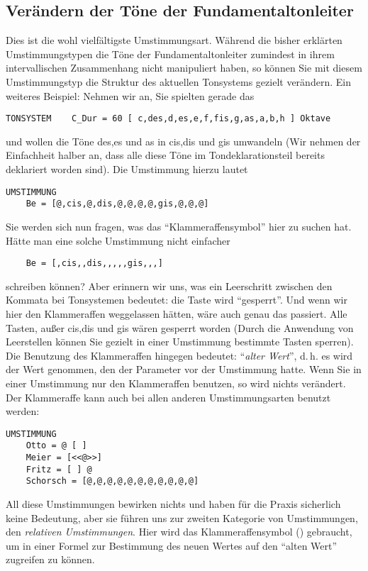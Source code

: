 \subsection{Verändern der Töne der Fundamentaltonleiter}\label{sec:verandern-der-tone}

Dies ist die wohl vielfältigste Umstimmungsart. Während die bisher
er\-klär\-ten Umstimmungstypen die Töne der Fundamentaltonleiter zumindest in ihrem
intervallischen Zusammenhang nicht manipuliert haben, so können
Sie mit diesem Umstimmungstyp die Struktur des aktuellen Tonsystems
gezielt verändern.
Ein weiteres Beispiel: Nehmen wir an, Sie spielten gerade das
\begin{verbatim}
TONSYSTEM    C_Dur = 60 [ c,des,d,es,e,f,fis,g,as,a,b,h ] Oktave
\end{verbatim}
und wollen die Töne des,es und as in cis,dis und gis umwandeln
(Wir nehmen der Einfachheit halber an, dass alle diese Töne im
Tondeklarationsteil bereits deklariert worden sind). Die
Umstimmung hierzu lautet
\begin{verbatim}
UMSTIMMUNG
    Be = [@,cis,@,dis,@,@,@,@,gis,@,@,@]
\end{verbatim}
Sie werden sich nun fragen, was das "`Klammeraffensymbol"' hier zu
suchen hat. Hätte man eine solche Umstimmung nicht einfacher
\begin{verbatim}
    Be = [,cis,,dis,,,,,gis,,,]
\end{verbatim}
schreiben können? Aber erinnern wir uns, was ein Leerschritt
zwischen den Kommata bei Tonsystemen bedeutet: die Taste wird
"`gesperrt"'. Und wenn wir hier den Klammeraffen weggelassen hätten,
wäre auch genau das passiert. Alle Tasten, außer cis,dis und gis
wären gesperrt worden (Durch die Anwendung von Leerstellen können
Sie gezielt in einer Umstimmung bestimmte Tasten sperren).
Die Benutzung des Klammeraffen hingegen bedeutet: "`\emph{alter Wert}"',
d.\,h. es wird der Wert genommen, den der Parameter vor der
Umstimmung hatte. Wenn Sie in einer Umstimmung nur den
Klammeraffen benutzen, so wird nichts verändert. Der Klammeraffe
kann auch bei allen anderen Umstimmungsarten benutzt werden:
\begin{verbatim}
UMSTIMMUNG
    Otto = @ [ ]
    Meier = [<<@>>]
    Fritz = [ ] @
    Schorsch = [@,@,@,@,@,@,@,@,@,@,@]
\end{verbatim}
All diese Umstimmungen bewirken nichts und haben für die Praxis
sicherlich keine Bedeutung, aber sie führen uns zur zweiten Kategorie
von Umstimmungen, den \emph{relativen
  Umstimmungen}. Hier wird das
Klammeraffensymbol () gebraucht, um in einer Formel zur
Bestimmung des neuen Wertes auf den "`alten Wert"' zugreifen zu
können.

